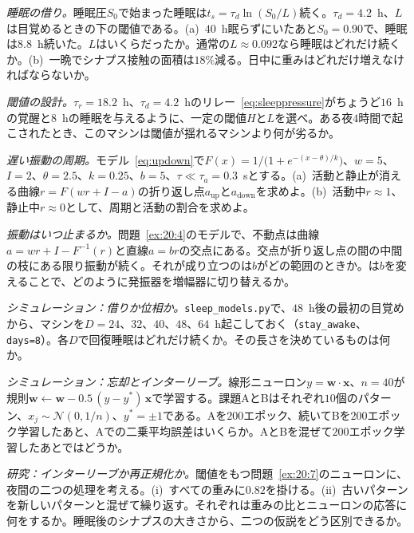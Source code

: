 \begin{exercise}[\lvlA]
\label{ex:20:2}
\emph{睡眠の借り。}睡眠圧$S_0$で始まった睡眠は$t_s=\tau_d\ln(S_0/L)$続く。$\tau_d=4.2$~h、$L$は目覚めるときの下の閾値である。(a)~$40$~h眠らずにいたあと$S_0=0.90$で、睡眠は$8.8$~h続いた。$L$はいくらだったか。通常の$L\approx0.092$なら睡眠はどれだけ続くか。(b)~一晩でシナプス接触の面積は$18\%$減る。日中に重みはどれだけ増えなければならないか。
\end{exercise}

\begin{exercise}[\lvlB]
\label{ex:20:3}
\emph{閾値の設計。}$\tau_r=18.2$~h、$\tau_d=4.2$~hのリレー~\eqref{eq:sleeppressure}がちょうど$16$~hの覚醒と$8$~hの睡眠を与えるように、一定の閾値$H$と$L$を選べ。ある夜$4$時間で起こされたとき、このマシンは閾値が揺れるマシンより何が劣るか。
\end{exercise}

\begin{exercise}[\lvlB]
\label{ex:20:4}
\emph{遅い振動の周期。}モデル~\eqref{eq:updown}で$F(x)=1/\bigl(1+e^{-(x-\theta)/k}\bigr)$、$w=5$、$I=2$、$\theta=2.5$、$k=0.25$、$b=5$、$\tau\ll\tau_a=0.3$~sとする。(a)~活動と静止が消える曲線$r=F(wr+I-a)$の折り返し点$a_{\text{up}}$と$a_{\text{down}}$を求めよ。(b)~活動中$r\approx1$、静止中$r\approx0$として、周期と活動の割合を求めよ。
\end{exercise}

\begin{exercise}[\lvlB]
\label{ex:20:5}
\emph{振動はいつ止まるか。}問題~\ref{ex:20:4}のモデルで、不動点は曲線$a=wr+I-F^{-1}(r)$と直線$a=br$の交点にある。交点が折り返し点の間の中間の枝にある限り振動が続く。それが成り立つのは$b$がどの範囲のときか。は$b$を変えることで、どのように発振器を増幅器に切り替えるか。
\end{exercise}

\begin{exercise}[\lvlB]
\label{ex:20:6}
\emph{シミュレーション：借りか位相か。}\texttt{sleep\_models.py}で、$48$~h後の最初の目覚めから、マシンを$D=24$、$32$、$40$、$48$、$64$~h起こしておく（\texttt{stay\_awake}、\texttt{days=8}）。各$D$で回復睡眠はどれだけ続くか。その長さを決めているものは何か。
\end{exercise}

\begin{exercise}[\lvlB]
\label{ex:20:7}
\emph{シミュレーション：忘却とインターリーブ。}線形ニューロン$y=\mathbf w\cdot\mathbf x$、$n=40$が規則$\mathbf w\leftarrow\mathbf w-0.5\,(y-y^*)\,\mathbf x$で学習する。課題AとBはそれぞれ$10$個のパターン、$x_j\sim\mathcal N(0,1/n)$、$y^*=\pm1$である。Aを$200$エポック、続いてBを$200$エポック学習したあと、Aでの二乗平均誤差はいくらか。AとBを混ぜて$200$エポック学習したあとではどうか。
\end{exercise}

\begin{exercise}[\lvlC]
\label{ex:20:8}
\emph{研究：インターリーブか再正規化か。}閾値をもつ問題~\ref{ex:20:7}のニューロンに、夜間の二つの処理を考える。(i)~すべての重みに$0.82$を掛ける。(ii)~古いパターンを新しいパターンと混ぜて繰り返す。それぞれは重みの比とニューロンの応答に何をするか。睡眠後のシナプスの大きさから、二つの仮説をどう区別できるか。
\end{exercise}
